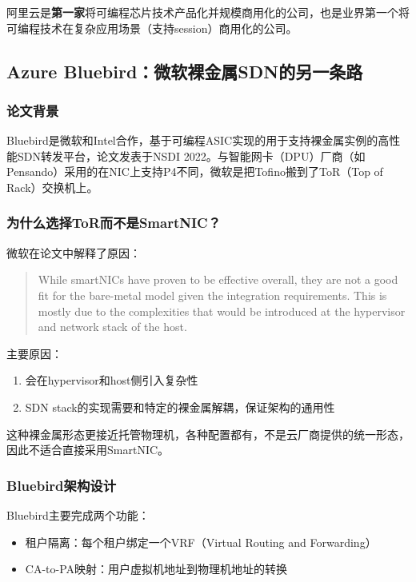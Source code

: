 阿里云是\textbf{第一家}将可编程芯片技术产品化并规模商用化的公司，也是业界第一个将可编程技术在复杂应用场景（支持session）商用化的公司。

\subsection{Azure Bluebird：微软裸金属SDN的另一条路}

\subsubsection{论文背景}

Bluebird是微软和Intel合作，基于可编程ASIC实现的用于支持裸金属实例的高性能SDN转发平台，论文发表于NSDI 2022。与智能网卡（DPU）厂商（如Pensando）采用的在NIC上支持P4不同，微软是把Tofino搬到了ToR（Top of Rack）交换机上。

\subsubsection{为什么选择ToR而不是SmartNIC？}

微软在论文中解释了原因：
\begin{quote}
While smartNICs have proven to be effective overall, they are not a good fit for the bare-metal model given the integration requirements. This is mostly due to the complexities that would be introduced at the hypervisor and network stack of the host.
\end{quote}

主要原因：
\begin{enumerate}
    \item 会在hypervisor和host侧引入复杂性
    \item SDN stack的实现需要和特定的裸金属解耦，保证架构的通用性
\end{enumerate}

这种裸金属形态更接近托管物理机，各种配置都有，不是云厂商提供的统一形态，因此不适合直接采用SmartNIC。

\subsubsection{Bluebird架构设计}

Bluebird主要完成两个功能：
\begin{itemize}
    \item 租户隔离：每个租户绑定一个VRF（Virtual Routing and Forwarding）
    \item CA-to-PA映射：用户虚拟机地址到物理机地址的转换
\end{itemize}

